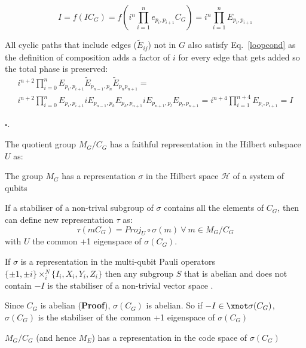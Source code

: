\documentclass[twoside]{article}
\begin{document}
\begin{romanlist}
\begin{alphlist}
                \begin{equation}
                       I = f(IC_G) = f\left( i^{n} \prod_{i=1}^n e_{p_i, p_{i+1}} C_G \right) =  i^{n} \prod_{i=1}^n E_{p_i, p_{i+1}}
                \end{equation}
                \item All cyclic paths that include edges ($\tilde E_{ij}$) not in $G$ also satisfy Eq.~\ref{loopcond} as the definition of composition adds a factor of $i$ for every edge that gets added so the total phase is preserved:
                \begin{multline}
                        i^{n+2} \prod^n_{i=0}E_{p_i,p_{i+1}} \tilde E_{p_{n-1}, p_n} \tilde E_{p_n p_{n+1}} =\\ i^{n+2} \prod^n_{i=0}E_{p_i,p_{i+1}} i E_{p_{n-1}, p_k} E_{p_k, p_{n+1}} i E_{p_{n+1}, p_l} E_{p_l, p_{n+1}}= i^{n+4} \prod^{n+4}_{i=1}E_{p_i, p_{i+1}} = I
                \end{multline}
        \end{alphlist} $\square$.
\item The quotient group $M_G/C_G$ has a faithful representation in the Hilbert subspace $U$ as:
        \begin{alphlist}
        \item The group $M_G$ has a representation $\sigma$ in the Hilbert space $\mathcal{H}$ of a system of qubits
        \item If a stabiliser of a non-trival subgroup of $\sigma$ contains all the elements of $C_G$, then can define new representation $\tau$ as:
                \begin{equation}
                        \tau (m C_G) = Proj_U \circ \sigma(m) \> \forall \> m \in M_G/C_G
                \end{equation}
                with $U$ the common +1 eigenspace of $\sigma(C_G)$.
        \end{alphlist}
\item If $\sigma$ is a representation in the multi-qubit Pauli operators $\{\pm 1, \pm i\} \times^N_i \{I_i, X_i, Y_i, Z_i\}$ then any subgroup $S$ that is abelian and does not contain $-I$ is the stabiliser of a non-trivial vector space \cite{nielsenChuang}.
\item Since $C_G$ is abelian (\textbf{Proof}), $\sigma(C_G)$ is abelian. So if $-I \in\xnot \sigma(C_G)$, $\sigma(C_G)$ is the stabiliser of the common +1 eigenspace of $\sigma(C_G)$
\item $M_G/C_G$ (and hence $M_E$) has a representation in the code space of $\sigma(C_G)$
\end{romanlist}
\end{document}
